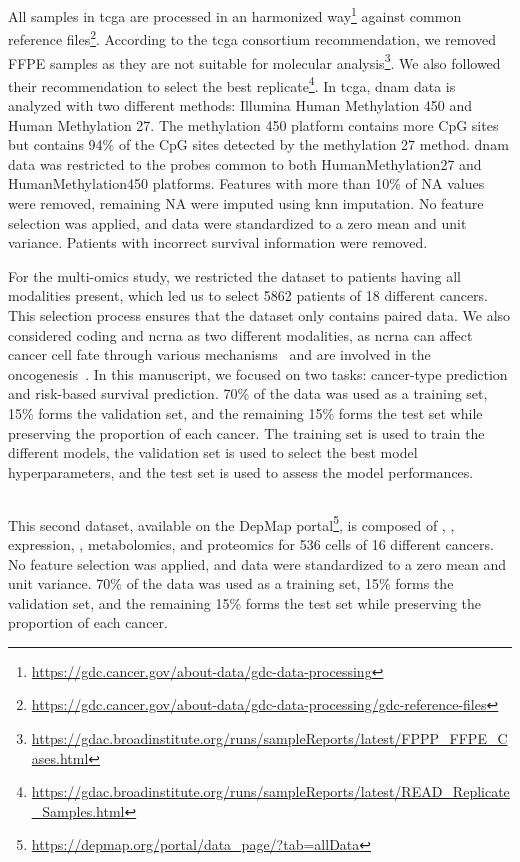 \documentclass[../main.tex]{subfiles}
\begin{document}
		All samples in \gls{tcga} are processed in an harmonized way\footnote{\url{https://gdc.cancer.gov/about-data/gdc-data-processing}} against common reference files\footnote{\url{https://gdc.cancer.gov/about-data/gdc-data-processing/gdc-reference-files}}.
		According to the \gls{tcga} consortium recommendation, we removed FFPE samples as they are not suitable for molecular analysis\footnote{\href{https://web.archive.org/web/20150919082952/https://gdac.broadinstitute.org/runs/sampleReports/latest/FPPP_FFPE_Cases.html}{https://gdac.broadinstitute.org/runs/sampleReports/latest/FPPP\_FFPE\_Cases.html}}.
		We also followed their recommendation to select the best replicate\footnote{\href{https://web.archive.org/web/20150919044554/http://gdac.broadinstitute.org/runs/sampleReports/latest/READ_Replicate_Samples.html}{https://gdac.broadinstitute.org/runs/sampleReports/latest/READ\_Replicate\_Samples.html}}.
		In \gls{tcga}, \gls{dnam} data is analyzed with two different methods: Illumina Human Methylation 450 and Human Methylation 27.
		The methylation 450 platform contains more CpG sites but contains 94\% of the CpG sites detected by the methylation 27 method.
		\Gls{dnam} data was restricted to the probes common to both HumanMethylation27 and HumanMethylation450 platforms.
		Features with more than 10\% of NA values were removed, remaining NA were imputed using \gls{knn} imputation.
		No feature selection was applied, and data were standardized to a zero mean and unit variance.
		Patients with incorrect survival information were removed.

		For the multi-omics study, we restricted the dataset to patients having all modalities present, which led us to select 5862 patients of 18 different cancers.
		This selection process ensures that the dataset only contains paired data.
		We also considered coding and \gls{ncrna} as two different modalities, as \gls{ncrna} can affect cancer cell fate through various mechanisms~\cite{Grillone2020} and are involved in the oncogenesis~\cite{Toden2021}.
		In this manuscript, we focused on two tasks: cancer-type prediction and risk-based survival prediction.
		70\% of the data was used as a training set, 15\% forms the validation set, and the remaining 15\% forms the test set while preserving the proportion of each cancer.
		The training set is used to train the different models, the validation set is used to select the best model hyperparameters, and the test set is used to assess the model performances.

	\subsection{}
		This second dataset, available on the DepMap portal\footnote{\url{https://depmap.org/portal/data_page/?tab=allData}}, is composed of , ,  expression, , metabolomics, and proteomics for 536 cells of 16 different cancers.
		No feature selection was applied, and data were standardized to a zero mean and unit variance.
		70\% of the data was used as a training set, 15\% forms the validation set, and the remaining 15\% forms the test set while preserving the proportion of each cancer.
\end{document}
